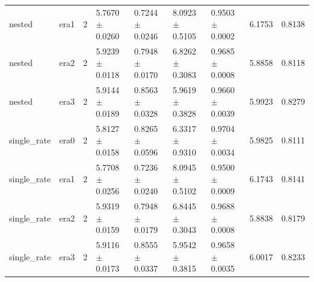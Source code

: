 \begin{tabular}{lllllllll}
nested & era1 & 2 & 5.7670 $\pm$ 0.0260 & 0.7244 $\pm$ 0.0246 & 8.0923 $\pm$ 0.5105 & 0.9503 $\pm$ 0.0002 & 6.1753 & 0.8138 \\
nested & era2 & 2 & 5.9239 $\pm$ 0.0118 & 0.7948 $\pm$ 0.0170 & 6.8262 $\pm$ 0.3083 & 0.9685 $\pm$ 0.0008 & 5.8858 & 0.8118 \\
nested & era3 & 2 & 5.9144 $\pm$ 0.0189 & 0.8563 $\pm$ 0.0328 & 5.9619 $\pm$ 0.3828 & 0.9660 $\pm$ 0.0039 & 5.9923 & 0.8279 \\
single\_rate & era0 & 2 & 5.8127 $\pm$ 0.0158 & 0.8265 $\pm$ 0.0596 & 6.3317 $\pm$ 0.9310 & 0.9704 $\pm$ 0.0034 & 5.9825 & 0.8111 \\
single\_rate & era1 & 2 & 5.7708 $\pm$ 0.0256 & 0.7236 $\pm$ 0.0240 & 8.0945 $\pm$ 0.5102 & 0.9500 $\pm$ 0.0009 & 6.1743 & 0.8141 \\
single\_rate & era2 & 2 & 5.9319 $\pm$ 0.0159 & 0.7948 $\pm$ 0.0179 & 6.8445 $\pm$ 0.3043 & 0.9688 $\pm$ 0.0008 & 5.8838 & 0.8179 \\
single\_rate & era3 & 2 & 5.9116 $\pm$ 0.0173 & 0.8555 $\pm$ 0.0337 & 5.9542 $\pm$ 0.3815 & 0.9658 $\pm$ 0.0035 & 6.0017 & 0.8233 \\
\hline
\end{tabular}
